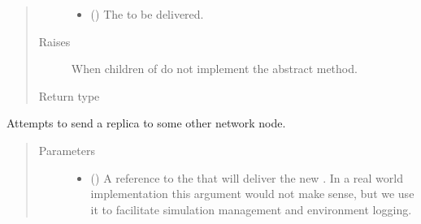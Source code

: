 \documentclass[letterpaper,10pt,english]{sphinxmanual}
\begin{document}
\begin{fulllineitems}
\begin{fulllineitems}
\begin{quote}
\begin{description}
\begin{itemize}
\item {} 
 ({\hyperref[\detokenize{app.domain.helpers:app.domain.helpers.smart_dataclasses.FileBlockData}]{}}) \textendash{} The {\hyperref[\detokenize{app.domain.helpers:app.domain.helpers.smart_dataclasses.FileBlockData}]{}}
to be delivered.

\end{itemize}

\item[{Raises}] \leavevmode
{} \textendash{} When children of  do not implement the abstract method.

\item[{Return type}] \leavevmode
{}

\end{description}\end{quote}

\end{fulllineitems}


\begin{fulllineitems}
\label{\detokenize{app.domain:app.domain.network_nodes.Node.send_part}}
Attempts to send a replica to some other network node.
\begin{quote}\begin{description}
\item[{Parameters}] \leavevmode\begin{itemize}
\item {} 
 ({\hyperref[\detokenize{app:app.type_hints.ClusterType}]{}}) \textendash{} A reference to the
{\hyperref[\detokenize{app.domain:app.domain.cluster_groups.Cluster}]{}} that will
deliver the new . In a real
world implementation this argument would not make sense,
but we use it to facilitate simulation management and
environment logging.


\end{itemize}
\end{description}
\end{quote}
\end{fulllineitems}
\end{fulllineitems}
\end{document}
